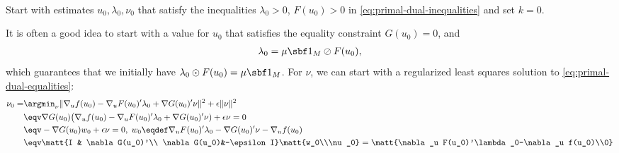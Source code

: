 \documentclass[11pt]{article}
\begin{document}
\begin{algorithm}~\label{al:primal-dual-o}
\begin{steps}
\item Start with estimates $u_0,\lambda_0,\nu_0$ that satisfy the inequalities
  $\lambda_0>0$, $F(u_0)> 0$ in \eqref{eq:primal-dual-inequalities}
  and set $k=0$.

  It is often a good idea to start with a value for $u_0$ that
  satisfies the equality constraint $G(u_0)=0$, and
  \begin{align*}
    \lambda_0=\mu\sbf 1_{M}\oslash F(u_0),
  \end{align*}
  which guarantees that we initially have
  $\lambda_0\odot F(u_0)=\mu\sbf 1_{M}$. For $\nu$, we can start with a regularized least squares
  solution to \eqref{eq:primal-dual-equalities}:
  \begin{align*}
    \nu_0=&\argmin_\nu \|\nabla_u f(u_0)-\nabla_u F(u_0)'\lambda_0+\nabla G(u_0)'\nu\|^2+\epsilon\|\nu\|^2\\
    &\eqv \nabla G(u_0)\big(\nabla_u f(u_0)-\nabla_u F(u_0)'\lambda_0+\nabla G(u_0)'\nu)+\epsilon\nu=0\\
    &\eqv -\nabla G(u_0) w_0+\epsilon\nu=0,\; w_0\eqdef\nabla_u F(u_0)'\lambda_0-\nabla G(u_0)'\nu-\nabla_u f(u_0)\\
    &\eqv \matt{I & \nabla G(u_0)'\\ \nabla G(u_0)&-\epsilon I}\matt{w_0\\\nu_0}=\matt{\nabla_u F(u_0)'\lambda_0-\nabla_u f(u_0)\\0}
  \end{align*}


\end{steps}
\end{algorithm}
\end{document}

